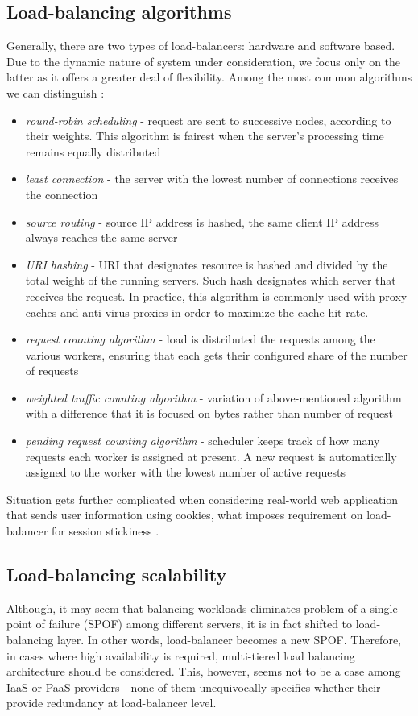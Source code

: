 \subsection{Load-balancing algorithms}
Generally, there are two types of load-balancers: hardware and software based. Due to the dynamic nature of system under consideration, we focus only on the latter as it offers a greater deal of flexibility. Among the most common algorithms we can distinguish \cite{HaProxyDoc}:
\begin{itemize}
 \item \textit{round-robin scheduling} - request are sent to successive nodes, according to their weights. This algorithm is fairest when the server's processing time remains equally distributed \cite{HaProxyDoc}
 \item \textit{least connection} - the server with the lowest number of connections receives the connection
 \item \textit{source routing} - source IP address is hashed, the same client IP address always reaches the same server
 \item \textit{URI hashing} - URI that designates resource is hashed and divided by the total weight of the running servers. Such hash designates which server that receives the request. In practice, this algorithm is commonly used with proxy caches and anti-virus proxies in order to maximize the cache hit rate.
 \item \textit{request counting algorithm} - load is distributed the requests among the various workers, ensuring that each gets their configured share of the number of requests
 \item \textit{weighted traffic counting algorithm} - variation of above-mentioned algorithm with a difference that it is focused on bytes rather than number of request
 \item \textit{pending request counting algorithm} - scheduler keeps track of how many requests each worker is assigned at present. A new request is automatically assigned to the worker with the lowest number of active requests
\end{itemize}

Situation gets further complicated when considering real-world web application that sends user information using cookies, what imposes requirement on load-balancer for session stickiness \cite{StBaMa11}. 

\subsection{Load-balancing scalability}
Although, it may seem that balancing workloads eliminates problem of a single point of failure (SPOF) among different servers, it is in fact shifted to load-balancing layer. In other words, load-balancer becomes a new SPOF. Therefore, in cases where high availability is required, multi-tiered load balancing architecture should be considered. This, however, seems not to be a case among IaaS or PaaS providers - none of them unequivocally specifies whether their provide redundancy at load-balancer level.

